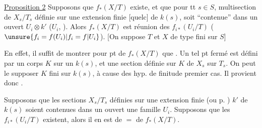 \uline{Proposition 2} Supposons que $f_*(X/T)$ existe, et que pour tt $s\in S$,  multisection de $X_s/T_s$ définie sur une extension finie  [quelc] de $k(s)$, soit ``contenue'' dans un ouvert  $U_i\otimes k'$ ($U_i$, ). Alors $f_*(X/T)$ est réunion des $f_{i*}(U_i/T)$ ($\unsure{f_i=f(U_i)|f_i=f\vert U_i}$).
[On suppose $T$ et $X$ de type fini sur $S$]

En effet,  il suffit de montrer pour  pt  de $f_*(X/T)$ que .
Un tel pt fermé est défini par un corps $K$ sur un $k(s)$, et une section définie sur $K$ de $X_s$ sur $T_s$. On peut le supposer  $K$ fini sur $k(s)$, à cause des hyp. de finitude   premier cas. Il provient donc \unsure{---}.

  Supposons que les sections $X_s/T_s$ définies sur une extension finie (ou p. ) $k'$ de $k(s)$ soient contenues dans un ouvert   une famille $U_i$.
Supposons que les $f_{i*}(U_i/T)$ existent, alors il en est de $=$ de $f_*(X/T)$.
